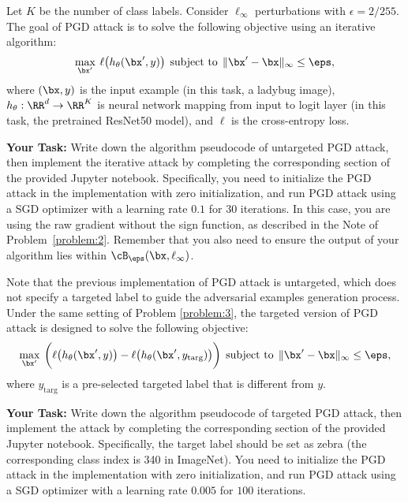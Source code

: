 \documentclass[11pt]{article}
\begin{document}
\begin{problem}[10 pts]
\label{problem:3}
\rm
Let $K$ be the number of class labels. Consider $\ell_\infty$ perturbations with $\epsilon=2/255$. The goal of PGD attack is to solve the following objective using an iterative algorithm:
\begin{align*}
    \max_{\bx'}\:\ell\big(h_\theta(\bx', y)\big) \:\: \text{subject to} \:\: \|\bx' - \bx\|_\infty \leq \eps,
\end{align*}
where $(\bx,y)$ is the input example (in this task, a ladybug image), $h_\theta:\RR^d\rightarrow\RR^K$ is neural network mapping from input to logit layer (in this task, the pretrained ResNet50 model), and $\ell$ is the cross-entropy loss.

\textbf{Your Task:} Write down the algorithm pseudocode of untargeted PGD attack, then implement the iterative attack by completing the corresponding section of the provided Jupyter notebook. Specifically, you need to initialize the PGD attack in the implementation with zero initialization, and run PGD attack using a SGD optimizer with a learning rate $0.1$ for $30$ iterations. In this case, you are using the raw gradient without the sign function, as described in the Note of Problem~\ref{problem:2}. Remember that you also need to ensure the output of your algorithm lies within $\cB_\eps(\bx, \ell_\infty)$.
\end{problem}




\directions{\clearpage}


\begin{problem}[10 pts]
\label{problem:4}
\rm
Note that the previous implementation of PGD attack is untargeted, which does not specify a targeted label to guide the adversarial examples generation process. Under the same setting of Problem \ref{problem:3}, the targeted version of PGD attack is designed to solve the following objective:
\begin{align*}
    \max_{\bx'}\: \bigg(\ell\big(h_\theta(\bx', y)\big) -\ell\big(h_\theta(\bx', y_{\mathrm{targ}})\big)\bigg) \:\: \text{subject to} \:\: \|\bx' - \bx\|_\infty \leq \eps,
\end{align*}
where $y_{\mathrm{targ}}$ is a pre-selected targeted label that is different from $y$. 

\textbf{Your Task:} Write down the algorithm pseudocode of targeted PGD attack, then implement the attack by completing the corresponding section of the provided Jupyter notebook. Specifically, the target label should be set as zebra (the corresponding class index is 340 in ImageNet). You need to initialize the PGD attack in the implementation with zero initialization, and run PGD attack using a SGD optimizer with a learning rate $0.005$ for $100$ iterations.
\end{problem}
\end{document}
